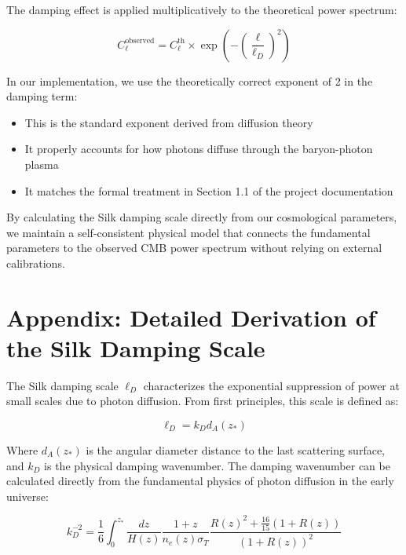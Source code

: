 \documentclass[11pt]{article}
\begin{document}
The damping effect is applied multiplicatively to the theoretical power spectrum:

\begin{equation}
C_\ell^{\text{observed}} = C_\ell^{\text{th}} \times \exp\left(-\left(\frac{\ell}{\ell_D}\right)^{2}\right)
\end{equation}

In our implementation, we use the theoretically correct exponent of 2 in the damping term:
\begin{itemize}
\item This is the standard exponent derived from diffusion theory
\item It properly accounts for how photons diffuse through the baryon-photon plasma
\item It matches the formal treatment in Section 1.1 of the project documentation
\end{itemize}

By calculating the Silk damping scale directly from our cosmological parameters, we maintain a self-consistent physical model that connects the fundamental parameters to the observed CMB power spectrum without relying on external calibrations.

\section{Appendix: Detailed Derivation of the Silk Damping Scale}
\label{sec:appendix_silk}

The Silk damping scale $\ell_D$ characterizes the exponential suppression of power at small scales due to photon diffusion. From first principles, this scale is defined as:

\begin{equation}
\ell_D = k_D d_A(z_*)
\end{equation}

Where $d_A(z_*)$ is the angular diameter distance to the last scattering surface, and $k_D$ is the physical damping wavenumber. The damping wavenumber can be calculated directly from the fundamental physics of photon diffusion in the early universe:

\begin{equation}
k_D^{-2} = \frac{1}{6} \int_{0}^{z_*} \frac{dz}{H(z)} \frac{1+z}{n_e(z) \sigma_T} \frac{R(z)^2 + \frac{16}{15}(1+R(z))}{(1+R(z))^2}
\end{equation}
\end{document}
